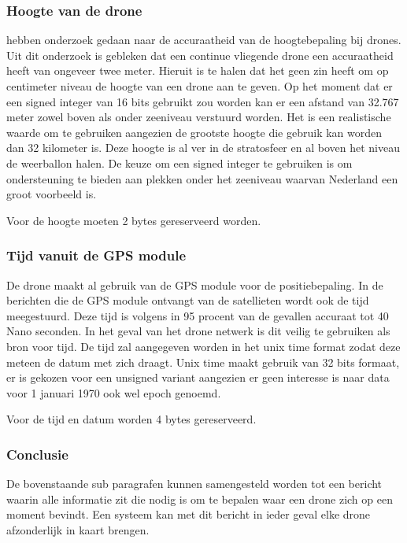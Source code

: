 \documentclass[a4paper, 11pt, oneside]{report}
\begin{document}
\subsubsection*{Hoogte van de drone}
 hebben onderzoek gedaan naar de accuraatheid van de hoogtebepaling bij drones. 
Uit dit onderzoek is gebleken dat een continue vliegende drone een accuraatheid heeft van ongeveer twee meter.
Hieruit is te halen dat het geen zin heeft om op centimeter niveau de hoogte van een drone aan te geven.
Op het moment dat er een signed integer van 16 bits gebruikt zou worden kan er een afstand van 32.767 meter zowel boven als onder zeeniveau verstuurd worden.
Het is een realistische waarde om te gebruiken aangezien de grootste hoogte die gebruik kan worden dan 32 kilometer is.
Deze hoogte is al ver in de stratosfeer en al boven het niveau de weerballon halen. 
De keuze om een signed integer te gebruiken is om ondersteuning te bieden aan plekken onder het zeeniveau waarvan Nederland een groot voorbeeld is.

Voor de hoogte moeten 2 bytes gereserveerd worden. 

\subsubsection*{Tijd vanuit de GPS module}

De drone maakt al gebruik van de GPS module voor de positiebepaling.
In de berichten die de GPS module ontvangt van de satellieten wordt ook de tijd meegestuurd.
Deze tijd is volgens \cite{GPSaccu} in 95 procent van de gevallen accuraat tot 40 Nano seconden. 
In het geval van het drone netwerk is dit veilig te gebruiken als bron voor tijd.
De tijd zal aangegeven worden in het unix time format zodat deze meteen de datum met zich draagt.
Unix time maakt gebruik van 32 bits formaat, er is gekozen voor een unsigned variant aangezien er geen interesse is naar data voor 1 januari 1970 ook wel epoch genoemd.

Voor de tijd en datum worden 4 bytes gereserveerd.

\subsubsection*{Conclusie}  

De bovenstaande sub paragrafen kunnen samengesteld worden tot een bericht waarin alle informatie zit die nodig is om te bepalen waar een drone zich op een moment bevindt.
Een systeem kan met dit bericht in ieder geval elke drone afzonderlijk in kaart brengen.
\end{document}
